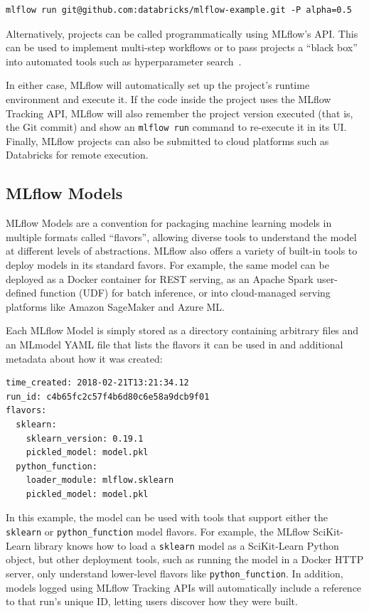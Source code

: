 \documentclass[11pt]{article}
\begin{document}
\begin{Verbatim}[frame=single,fontsize=\small,samepage=true]
mlflow run git@github.com:databricks/mlflow-example.git -P alpha=0.5
\end{Verbatim}

Alternatively, projects can be called programmatically using MLflow's API. This can be used to implement multi-step workflows or to pass projects a ``black box'' into automated tools such as hyperparameter search~\cite{hyperopt}.

In either case, MLflow will automatically set up the project's runtime environment and execute it. If the code inside the project uses the MLflow Tracking API, MLflow will also remember the project version executed (that is, the Git commit) and show an \texttt{mlflow run} command to re-execute it in its UI. Finally, MLflow projects can also be submitted to cloud platforms such as Databricks for remote execution.

\subsection{MLflow Models}

MLflow Models are a convention for packaging machine learning models in multiple formats called ``flavors'', allowing diverse tools to understand the model at different levels of abstractions. MLflow also offers a variety of built-in tools to deploy models in its standard favors. For example, the same model can be deployed as a Docker container for REST serving, as an Apache Spark user-defined function (UDF) for batch inference, or into cloud-managed serving platforms like Amazon SageMaker and Azure ML.

Each MLflow Model is simply stored as a directory containing arbitrary files and an MLmodel YAML file that lists the flavors it can be used in and additional metadata about how it was created:

\begin{Verbatim}[frame=single,fontsize=\small,samepage=true]
time_created: 2018-02-21T13:21:34.12
run_id: c4b65fc2c57f4b6d80c6e58a9dcb9f01
flavors:
  sklearn:
    sklearn_version: 0.19.1
    pickled_model: model.pkl
  python_function:
    loader_module: mlflow.sklearn
    pickled_model: model.pkl
\end{Verbatim}

In this example, the model can be used with tools that support either the \texttt{sklearn} or \texttt{python\_function} model flavors. For example, the MLflow SciKit-Learn library knows how to load a \texttt{sklearn} model as a SciKit-Learn Python object, but other deployment tools, such as running the model in a Docker HTTP server, only understand lower-level flavors like \texttt{python\_function}.
In addition, models logged using MLflow Tracking APIs will automatically include a reference to that run's unique ID, letting users discover how they were built.
\end{document}
